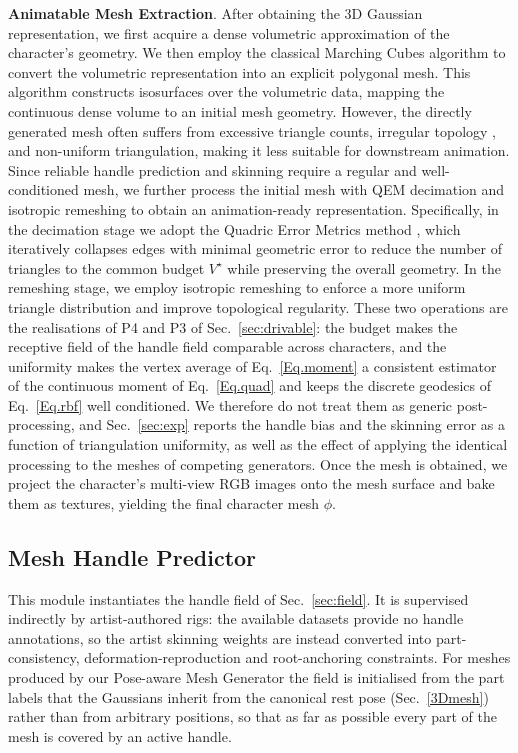 \documentclass[lettersize,journal]{IEEEtran}
\newcommand{\blu}[1]{\texorpdfstring{{\leavevmode\color{blue}#1}}{#1}}
\begin{document}
\textbf{Animatable Mesh Extraction}. After obtaining the 3D Gaussian representation, we first acquire a dense volumetric approximation of the character's geometry. We then employ the classical Marching Cubes \cite{lorensen1998marching}  algorithm to convert the volumetric representation into an explicit polygonal mesh. This algorithm constructs isosurfaces over the volumetric data, mapping the continuous dense volume to an initial mesh geometry. However, the directly generated mesh often suffers from excessive triangle counts, irregular topology , and \blu{non-uniform triangulation, making it less suitable for downstream
animation. Since reliable handle prediction and skinning require a regular
and well-conditioned} mesh, we further \blu{process} the initial mesh \blu{with QEM
decimation and isotropic remeshing to obtain an animation-ready
representation. Specifically, in} the decimation stage we adopt the Quadric Error Metrics \blu{method} \cite{garland1997surface}, which iteratively collapses edges \blu{with
minimal geometric error} to reduce the number of triangles to the common budget $V^{\star}$
while preserving
the \blu{overall} geometry. In the remeshing stage, we employ \blu{isotropic
remeshing} \cite{alliez2003isotropic} \blu{to enforce} a more uniform \blu{triangle
distribution and} improve topological regularity. These two operations are the realisations of
P4 and P3 of Sec.~\ref{sec:drivable}: the budget makes the receptive field of the handle field
comparable across characters, and the uniformity makes the vertex average of
Eq.~\ref{Eq.moment} a consistent estimator of the continuous moment of Eq.~\ref{Eq.quad} and
keeps the discrete geodesics of Eq.~\ref{Eq.rbf} well conditioned. We therefore do not treat
them as generic post-processing, and Sec.~\ref{sec:exp} reports the handle bias and the
skinning error as a function of triangulation uniformity, as well as the effect of applying
the identical processing to the meshes of competing generators.
Once the  mesh is obtained, we project the character's multi-view RGB images onto the mesh surface and bake them as textures, yielding the final character mesh $\phi$.


\subsection{Mesh Handle Predictor} \label{sec:handle}
\blu{This module} instantiates the handle field of Sec.~\ref{sec:field}. It \blu{is supervised
indirectly by artist-authored rigs: the available datasets provide no handle annotations, so
the artist skinning weights are instead converted into part-consistency,
deformation-reproduction and root-anchoring constraints. For meshes produced by our
Pose-aware Mesh} Generator the field is \blu{initialised from the part labels} that the Gaussians
inherit from the canonical rest pose (Sec.~\ref{3Dmesh}) \blu{rather than from arbitrary
positions, so that as far as possible every part of the mesh is covered by} an active handle.
\end{document}
